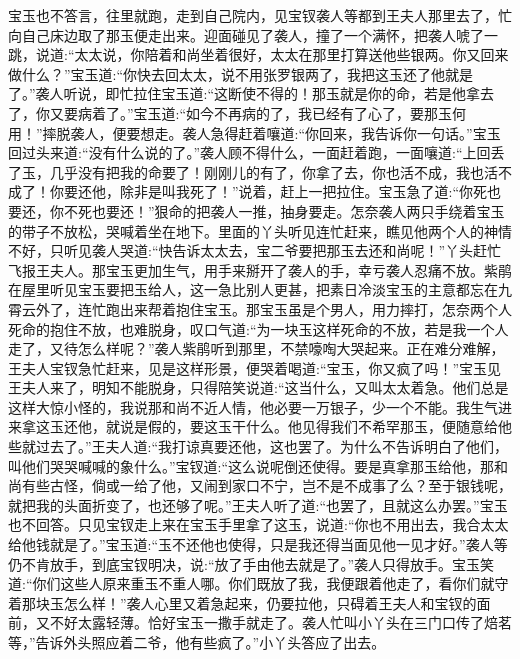 \begin{parag}
    宝玉也不答言，往里就跑，走到自己院内，见宝钗袭人等都到王夫人那里去了，忙向自己床边取了那玉便走出来。迎面碰见了袭人，撞了一个满怀，把袭人唬了一跳，说道:“太太说，你陪着和尚坐着很好，太太在那里打算送他些银两。你又回来做什么？”宝玉道:“你快去回太太，说不用张罗银两了，我把这玉还了他就是了。”袭人听说，即忙拉住宝玉道:“这断使不得的！那玉就是你的命，若是他拿去了，你又要病着了。”宝玉道:“如今不再病的了，我已经有了心了，要那玉何用！”摔脱袭人，便要想走。袭人急得赶着嚷道:“你回来，我告诉你一句话。”宝玉回过头来道:“没有什么说的了。”袭人顾不得什么，一面赶着跑，一面嚷道:“上回丢了玉，几乎没有把我的命要了！刚刚儿的有了，你拿了去，你也活不成，我也活不成了！你要还他，除非是叫我死了！”说着，赶上一把拉住。宝玉急了道:“你死也要还，你不死也要还！”狠命的把袭人一推，抽身要走。怎奈袭人两只手绕着宝玉的带子不放松，哭喊着坐在地下。里面的丫头听见连忙赶来，瞧见他两个人的神情不好，只听见袭人哭道:“快告诉太太去，宝二爷要把那玉去还和尚呢！”丫头赶忙飞报王夫人。那宝玉更加生气，用手来掰开了袭人的手，幸亏袭人忍痛不放。紫鹃在屋里听见宝玉要把玉给人，这一急比别人更甚，把素日冷淡宝玉的主意都忘在九霄云外了，连忙跑出来帮着抱住宝玉。那宝玉虽是个男人，用力摔打，怎奈两个人死命的抱住不放，也难脱身，叹口气道:“为一块玉这样死命的不放，若是我一个人走了，又待怎么样呢？”袭人紫鹃听到那里，不禁嚎啕大哭起来。正在难分难解，王夫人宝钗急忙赶来，见是这样形景，便哭着喝道:“宝玉，你又疯了吗！”宝玉见王夫人来了，明知不能脱身，只得陪笑说道:“这当什么，又叫太太着急。他们总是这样大惊小怪的，我说那和尚不近人情，他必要一万银子，少一个不能。我生气进来拿这玉还他，就说是假的，要这玉干什么。他见得我们不希罕那玉，便随意给他些就过去了。”王夫人道:“我打谅真要还他，这也罢了。为什么不告诉明白了他们，叫他们哭哭喊喊的象什么。”宝钗道:“这么说呢倒还使得。要是真拿那玉给他，那和尚有些古怪，倘或一给了他，又闹到家口不宁，岂不是不成事了么？至于银钱呢，就把我的头面折变了，也还够了呢。”王夫人听了道:“也罢了，且就这么办罢。”宝玉也不回答。只见宝钗走上来在宝玉手里拿了这玉，说道:“你也不用出去，我合太太给他钱就是了。”宝玉道:“玉不还他也使得，只是我还得当面见他一见才好。”袭人等仍不肯放手，到底宝钗明决，说:“放了手由他去就是了。”袭人只得放手。宝玉笑道:“你们这些人原来重玉不重人哪。你们既放了我，我便跟着他走了，看你们就守着那块玉怎么样！”袭人心里又着急起来，仍要拉他，只碍着王夫人和宝钗的面前，又不好太露轻薄。恰好宝玉一撒手就走了。袭人忙叫小丫头在三门口传了焙茗等，”告诉外头照应着二爷，他有些疯了。”小丫头答应了出去。
\end{parag}


